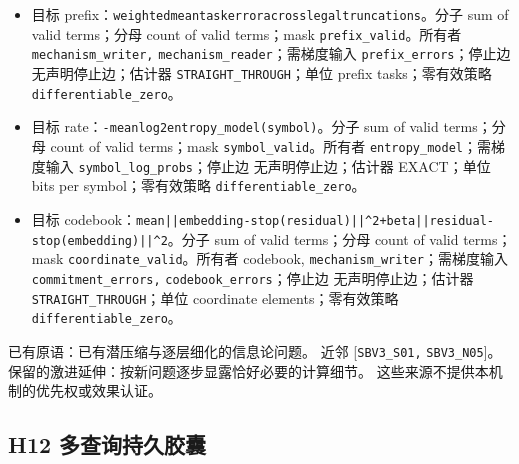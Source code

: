 \documentclass[
  10pt,
]{article}
\begin{document}
\begin{itemize}
\item
  目标
  prefix：{\small\nolinkurl{weighted}\hspace{0.333em}\nolinkurl{mean}\hspace{0.333em}\nolinkurl{task}\hspace{0.333em}\nolinkurl{error}\hspace{0.333em}\nolinkurl{across}\hspace{0.333em}\nolinkurl{legal}\hspace{0.333em}\nolinkurl{truncations}}。分子
  sum of valid terms；分母 count of valid terms；mask
  \nolinkurl{prefix_valid}。所有者 \nolinkurl{mechanism_writer,}
  \nolinkurl{mechanism_reader}；需梯度输入
  \nolinkurl{prefix_errors}；停止边 无声明停止边；估计器
  \nolinkurl{STRAIGHT_THROUGH}；单位 prefix tasks；零有效策略
  \nolinkurl{differentiable_zero}。
\item
  目标
  rate：{\small\nolinkurl{-mean}\hspace{0.333em}\nolinkurl{log2}\hspace{0.333em}\nolinkurl{entropy_model(symbol)}}。分子
  sum of valid terms；分母 count of valid terms；mask
  \nolinkurl{symbol_valid}。所有者 \nolinkurl{entropy_model}；需梯度输入
  \nolinkurl{symbol_log_probs}；停止边 无声明停止边；估计器 EXACT；单位
  bits per symbol；零有效策略 \nolinkurl{differentiable_zero}。
\item
  目标
  codebook：{\small\nolinkurl{mean}\hspace{0.333em}\nolinkurl{||embedding-stop(residual)||^2}\hspace{0.333em}\nolinkurl{+}\hspace{0.333em}\nolinkurl{beta||residual-stop(embedding)||^2}}。分子
  sum of valid terms；分母 count of valid terms；mask
  \nolinkurl{coordinate_valid}。所有者 codebook,
  \nolinkurl{mechanism_writer}；需梯度输入
  \nolinkurl{commitment_errors,} \nolinkurl{codebook_errors}；停止边
  无声明停止边；估计器 \nolinkurl{STRAIGHT_THROUGH}；单位 coordinate
  elements；零有效策略 \nolinkurl{differentiable_zero}。
\end{itemize}

已有原语：已有潜压缩与逐层细化的信息论问题。 近邻
{[}\nolinkurl{SBV3_S01,}
\nolinkurl{SBV3_N05}{]}。保留的激进延伸：按新问题逐步显露恰好必要的计算细节。
这些来源不提供本机制的优先权或效果认证。

\subsection{H12
多查询持久胶囊}\label{h12-ux591aux67e5ux8be2ux6301ux4e45ux80f6ux56ca}
\end{document}
